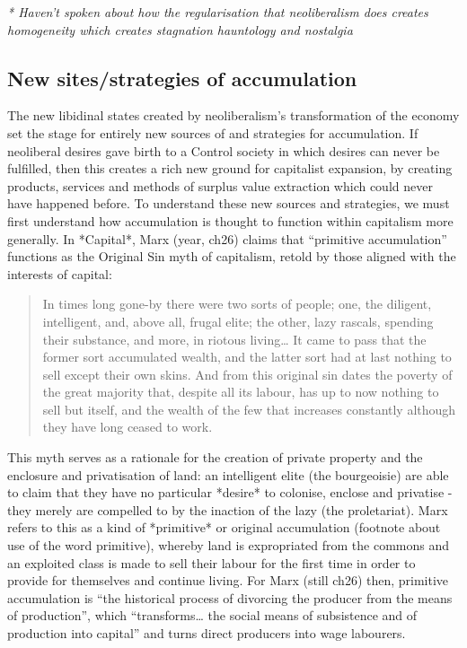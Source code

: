 \emph{\emph{* Haven't spoken about how the regularisation that
neoliberalism does creates homogeneity which creates stagnation
hauntology and nostalgia }}

\subsection{New sites/strategies of accumulation }
\label{new-sitesstrategies-of-accumulation}

The new libidinal states created by neoliberalism's transformation of
the economy set the stage for entirely new sources of and strategies for
accumulation. If neoliberal desires gave birth to a Control society in
which desires can never be fulfilled, then this creates a rich new
ground for capitalist expansion, by creating products, services and
methods of surplus value extraction which could never have happened
before. To understand these new sources and strategies, we must first
understand how accumulation is thought to function within capitalism
more generally. In *Capital*, Marx (year, ch26) claims that ``primitive
accumulation'' functions as the Original Sin myth of capitalism, retold
by those aligned with the interests of capital:

\begin{quote}
In times long gone-by there were two sorts of people; one, the diligent,
intelligent, and, above all, frugal elite; the other, lazy rascals,
spending their substance, and more, in riotous living\ldots{} It came to
pass that the former sort accumulated wealth, and the latter sort had at
last nothing to sell except their own skins. And from this original sin
dates the poverty of the great majority that, despite all its labour,
has up to now nothing to sell but itself, and the wealth of the few that
increases constantly although they have long ceased to work.
\end{quote}

This myth serves as a rationale for the creation of private property and
the enclosure and privatisation of land: an intelligent elite (the
bourgeoisie) are able to claim that they have no particular *desire* to
colonise, enclose and privatise - they merely are compelled to by the
inaction of the lazy (the proletariat). Marx refers to this as a kind of
*primitive* or original accumulation (footnote about use of the word
primitive), whereby land is expropriated from the commons and an
exploited class is made to sell their labour for the first time in order
to provide for themselves and continue living. For Marx (still ch26)
then, primitive accumulation is ``the historical process of divorcing
the producer from the means of production'', which ``transforms\ldots{}
the social means of subsistence and of production into capital'' and
turns direct producers into wage labourers.

